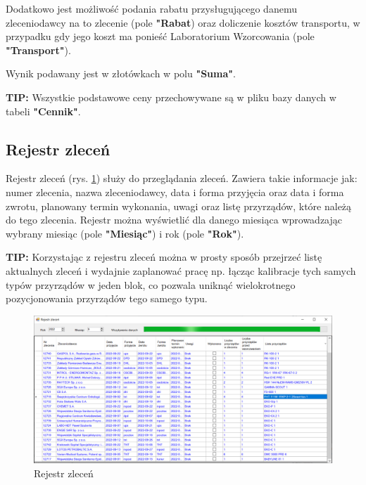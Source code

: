 Dodatkowo jest możliwość podania rabatu przysługującego danemu zleceniodawcy na to zlecenie (pole \textbf{"Rabat}) oraz doliczenie kosztów transportu, w przypadku gdy jego koszt ma ponieść Laboratorium Wzorcowania (pole \textbf{"Transport"}).

Wynik podawany jest w złotówkach w polu \textbf{"Suma"}.

\textbf{TIP:} Wszystkie podstawowe ceny przechowywane są w pliku bazy danych w tabeli \textbf{"Cennik"}. 



\subsection{Rejestr zleceń}
\label{rejestr}

Rejestr zleceń (rys. \ref{rejestrZlecen}) służy do przeglądania zleceń. Zawiera takie informacje jak: numer zlecenia, nazwa zleceniodawcy, data i forma przyjęcia oraz data i forma zwrotu, planowany termin wykonania, uwagi oraz listę przyrządów, które należą do tego zlecenia.
Rejestr można wyświetlić dla danego miesiąca wprowadzając wybrany miesiąc (pole \textbf{"Miesiąc"}) i rok (pole \textbf{"Rok"}). 

\textbf{TIP:} Korzystając z rejestru zleceń można w prosty sposób przejrzeć listę aktualnych zleceń i wydajnie zaplanować pracę np. łącząc kalibracje tych samych typów przyrządów w jeden blok, co pozwala uniknąć wielokrotnego pozycjonowania przyrządów tego samego typu.

\begin{figure}[htb]
	\centering
	\includegraphics{obrazki/Biuro/rejestr_zlecen.png}
	\caption{Rejestr zleceń}
	\label{rejestrZlecen}
\end{figure}